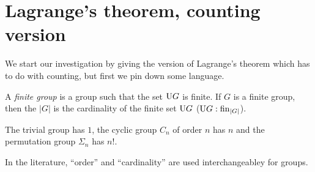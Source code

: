 


\section{Lagrange's theorem, counting version}
\label{sec:Lagrangecounting}

We start our investigation by giving the version of Lagrange's theorem which has to do with counting, but first we pin down some language.
\begin{definition}
  \label{def:finitegrd}
A \emph{finite group} is a group such that the set $\mathrm{U} G$ is finite.   If $G$ is a finite group, then the \emph{\gporder}\index{\gporder} $|G|$ is the cardinality of the finite set $\mathrm{U} G$ (\ie $\USym G:\fin_{|G|}$).
\end{definition}
\begin{example}
  The trivial group has \gporder $1$, the cyclic group $C_n$ of order $n$ has \gporder $n$ %
and the permutation group $\Sigma_n$ has \gporder $n!$.
\end{example}


In the literature, ``order'' and ``cardinality'' are used interchangeabley for groups.


